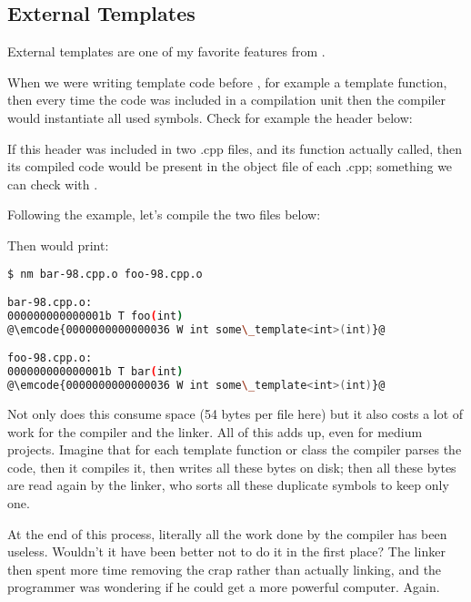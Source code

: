 \subsection{External Templates}

External templates are one of my favorite features from .

When we were writing template code before , for example a
template function, then every time the code was included in a
compilation unit then the compiler would instantiate all used
symbols. Check for example the header below:



If this header was included in two .cpp files, and its function
actually called, then its compiled code would be present in the object
file of each .cpp; something we can check with .

Following the example, let's compile the two files below:





Then  would print:

\begin{lstlisting}[language=bash]
$ nm bar-98.cpp.o foo-98.cpp.o

bar-98.cpp.o:
000000000000001b T foo(int)
@\emcode{0000000000000036 W int some\_template<int>(int)}@

foo-98.cpp.o:
000000000000001b T bar(int)
@\emcode{0000000000000036 W int some\_template<int>(int)}@
\end{lstlisting}

Not only does this consume space (54 bytes per file here) but it also
costs a lot of work for the compiler and the linker. All of this adds
up, even for medium projects. Imagine that for each template function
or class the compiler parses the code, then it compiles it, then
writes all these bytes on disk; then all these bytes are read again by
the linker, who sorts all these duplicate symbols to keep only one.

At the end of this process, literally all the work done by the
compiler has been useless. Wouldn't it have been better not to do it
in the first place? The linker then spent more time removing the crap
rather than actually linking, and the programmer was wondering if he
could get a more powerful computer. Again.

